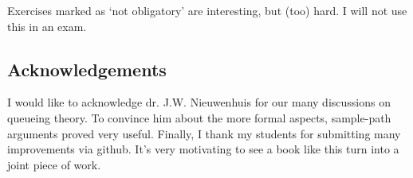 Exercises marked as `not obligatory' are interesting, but (too) hard.
I will not use this in an exam.

\subsection*{Acknowledgements}

I would like to acknowledge dr.
J.W.
Nieuwenhuis for our many discussions on queueing theory.
To convince him about the more formal aspects, sample-path arguments proved very useful.
Finally, I thank my students for submitting many improvements via github.
It's very motivating to see a book like this turn into a joint piece of work.



